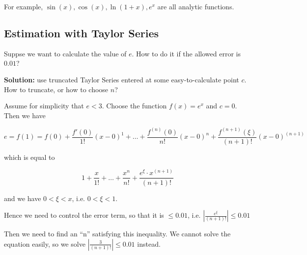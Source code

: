 For example, $\sin(x), \cos(x), \ln(1+x), e^x$ are all analytic functions.

\subsection{Estimation with Taylor Series}

Suppse we want to calculate the value of $e$. How to do it if the allowed error is $0.01$?

\textbf{Solution:} use truncated Taylor Series entered at some easy-to-calculate point $c$. \textrightarrow How to truncate, or how to choose $n$?

Assume for simplicity that $e < 3$. Choose the function $f(x) = e^x$ and $c = 0$. Then we have

$$ e = f(1) = f(0) + \frac{f'(0)}{1!} (x - 0)^1 + \dots + \frac{f^{(n)}(0)}{n!}(x - 0)^n + \frac{f^{(n+1)}(\xi)}{(n+1)!}(x - 0)^{(n+1)} $$

which is equal to

$$ 1 + \frac{x}{1!} + \dots + \frac{x^n}{n!} + \frac{e^\xi \cdot x^{(n + 1)}}{(n + 1)!} $$

and we have $0 < \xi < x$, i.e. $0 < \xi < 1$.

Hence we need to control the error term, so that it is $\leq 0.01$, i.e. $ | \frac{e^\xi}{(n + 1)!} | \leq 0.01 $

Then we need to find an ``n'' satisfying this inequality. We cannot solve the equation easily, so we solve $ | \frac{3}{(n+1)!} | \leq 0.01 $ instead.